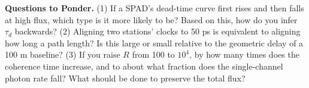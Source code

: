 \noindent\textbf{Questions to Ponder.} (1) If a SPAD's dead-time curve first rises and then falls at high flux, which type is it more likely to be? Based on this, how do you infer $\tau_d$ backwards? (2) Aligning two stations' clocks to 50 ps is equivalent to aligning how long a path length? Is this large or small relative to the geometric delay of a 100 m baseline? (3) If you raise $R$ from 100 to $10^4$, by how many times does the coherence time increase, and to about what fraction does the single-channel photon rate fall? What should be done to preserve the total flux?
